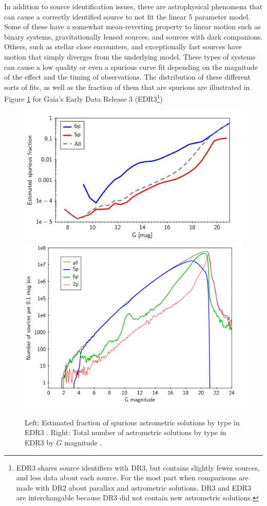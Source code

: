 \documentclass[preprint2]{aastex631}
\begin{document}
In addition to source identification issues, there are astrophysical phenomena that can cause a correctly identified source to not fit the linear 5 parameter model. Some of these have a somewhat mean-reverting property to linear motion such as binary systems, gravitationally lensed sources, and sources with dark companions. Others, such as stellar close encounters, and exceptionally fast sources have motion that simply diverges from the underlying model. These types of systems can cause a low quality or even a spurious curve fit depending on the magnitude of the effect and the timing of observations. The distribution of these different sorts of fits, as well as the fraction of them that are spurious are illustrated in Figure \ref{fig:spuriousfraction} for Gaia's Early Data Release 3 (EDR3\footnote{EDR3 shares source identifiers with DR3, but contains slightly fewer sources, and less data about each source. For the most part when comparisons are made with DR2 about parallax and astrometric solutions, DR3 and EDR3 are interchangable because DR3 did not contain new astrometric solutions. })
\begin{figure}
	\includegraphics[width=0.56\columnwidth]{spuriousfraction.png}
	\includegraphics[width=0.42\columnwidth]{magdistEDR3.png}

	\caption{Left: Estimated fraction of spurious astrometric solutions by type in EDR3 \citep{fabriciusGaia2021}. Right: Total number of astrometric solutions by type in EDR3 by $G$ magnitude \citep{lindegrenGaia2021a}.}
	\label{fig:spuriousfraction}
\end{figure}
\end{document}
